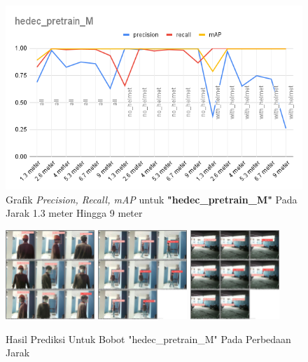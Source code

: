 \begin{enumerate}
  \begin{figure} [h!]
    \centering
    \includegraphics[width=1\textwidth]{gambar/BerdasarkanJarak/hedec_pretrain_M.png}
    \caption{Grafik \emph{Precision, Recall, mAP} untuk \textbf{"hedec\_pretrain\_M"} Pada Jarak 1.3 meter Hingga 9 meter}
    \label{fig:grafvaljarak_hedec_pretrain_M}  
  \end{figure}

  \FloatBarrier

  \begin{figure} [h!]
    \centering
    \includegraphics[width=0.3\textwidth]{gambar/BerdasarkanJarak_v2/val_hedec_pretrain_M/Jarak1_3/val_batch0_pred.jpg}
    \includegraphics[width=0.3\textwidth]{gambar/BerdasarkanJarak_v2/val_hedec_pretrain_M/Jarak5_3/val_batch0_pred.jpg}
    \includegraphics[width=0.3\textwidth]{gambar/BerdasarkanJarak_v2/val_hedec_pretrain_M/Jarak9/val_batch0_pred.jpg}
    \caption{Hasil Prediksi Untuk Bobot "hedec\_pretrain\_M" Pada Perbedaan Jarak}
    \label{fig:valjarak_sample_hedec_pretrain_M}  
  \end{figure}


\end{enumerate}
